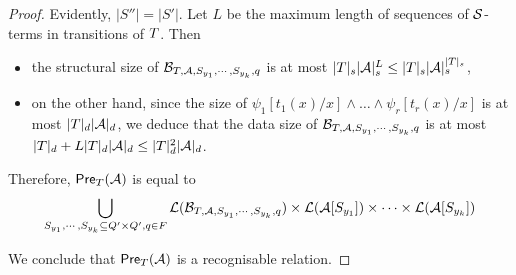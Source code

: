 \begin{proof}
%
%
Evidently, $|S''| = |S'|$.  Let $L$ be the maximum length of sequences of $\mathcal{S}$-terms in transitions of $T$. Then 
\begin{itemize}
\item the structural size of $\mathcal{B}_{T, \mathcal{A}, S_{y_1}, \cdots, S_{y_k}, q}$ is at most $|T|_s |\mathcal{A}|_s^{L} \le |T|_s |\mathcal{A}|_s^{|T|_s}$,
\item  on the other hand, since the size of $\psi_1[t_1(x)/x] \wedge \ldots \wedge \psi_r[t_r(x)/x]$ is at most $|T|_d |\mathcal{A}|_d$, we deduce that the data size of $\mathcal{B}_{T, \mathcal{A}, S_{y_1}, \cdots, S_{y_k}, q}$ is at most $|T|_d + L |T|_d |\mathcal{A}|_d \le |T|^2_d |\mathcal{A}|_d$.
\end{itemize}


Therefore, $\textsf{Pre}_{T}(\mathcal{A})$ is equal to 
\[
\bigcup_{S_{y_1}, \cdots, S_{y_k} \subseteq Q' \times Q', q\in F} \mathcal{L}(\mathcal{B}_{T, \mathcal{A}, S_{y_1}, \cdots, S_{y_k},q}) \times \mathcal{L}(\mathcal{A}[S_{y_1}]) \times \cdots  \times \mathcal{L}(\mathcal{A}[S_{y_k}])\]

We conclude that $\textsf{Pre}_{T}(\mathcal{A})$ is a recognisable relation. 


\end{proof}
